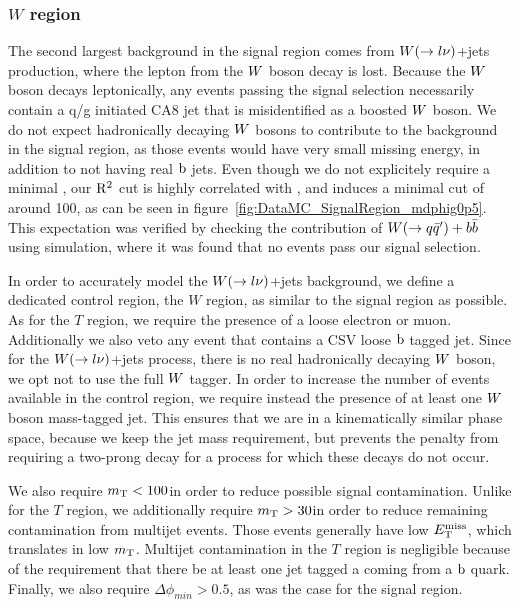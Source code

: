\subsubsection{\texorpdfstring{$W$}{W} region}

The second largest background in the signal region comes from $W(\rightarrow l\nu)$+jets
production, where the lepton from the $W$ boson decay is lost.
Because the $W$ boson decays leptonically, any events passing the signal selection necessarily
contain a q/g initiated CA8 jet that is misidentified as a boosted $W$ boson. 
We do not expect hadronically decaying $W$ bosons to contribute to the background in the signal
region, as those events would have very small missing energy, in addition to not having real
$\mathrm{b}$ jets. Even though we do not explicitely require a minimal \ETm, our $\mathrm{R^2}$ cut is highly
correlated with \ETm, and induces a minimal cut of around 100\GeV, as can be seen in
figure~\ref{fig:DataMC_SignalRegion_mdphig0p5}.  
This expectation was verified by checking the contribution of $W(\rightarrow
q\bar{q}')+b\bar{b}$ using simulation, where it was found that no events pass our signal
selection. 

In order to accurately model the $W(\rightarrow l\nu)$+jets background, we define a dedicated
control region, the $W$ region, as similar to the signal region as possible. As for the $T$ region,
we require the presence of a loose electron or muon. Additionally we also veto any event that
contains a CSV loose $\mathrm{b}$ tagged jet.  
Since for the $W(\rightarrow l\nu)$+jets process, there is no real hadronically decaying $W$
boson, we opt not to use the full $W$ tagger. 
In order to increase the number of events available in the control region, we require instead the
presence of at least one $W$ boson mass-tagged jet. This ensures that we are in a kinematically
similar phase space, because we keep the jet mass requirement, but prevents the penalty from
requiring a two-prong decay for a process for which these decays do not occur. 

We also require $m_{\mathrm{T}} < 100$\GeV in order to reduce possible signal contamination. Unlike for the $T$
region, we additionally require $m_{\mathrm{T}} > 30$\GeV in order to reduce remaining contamination from
multijet events. Those events generally have low $E_{\mathrm{T}}^{\text{miss}}$, which translates in low $m_{\mathrm{T}}$. 
Multijet contamination in the $T$ region is negligible because of the
requirement that there be at least one jet tagged a coming from a $\mathrm{b}$ quark. 
Finally, we also require $\Delta\phi_{min} > 0.5$, as was the case for the signal region. 

